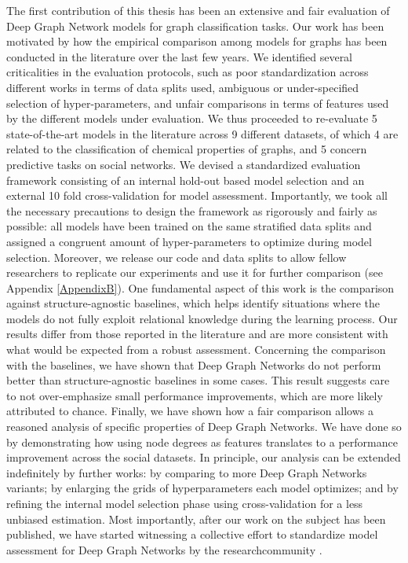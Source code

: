 The first contribution of this thesis has been an extensive and fair evaluation of Deep Graph Network models for graph classification tasks. Our work has been motivated by how the empirical comparison among models for graphs has been conducted in the literature over the last few years. We identified several criticalities in the evaluation protocols, such as poor standardization across different works in terms of data splits used, ambiguous or under-specified selection of hyper-parameters, and unfair comparisons in terms of features used by the different models under evaluation. We thus proceeded to re-evaluate 5 state-of-the-art models in the literature across 9 different datasets, of which 4 are related to the classification of chemical properties of graphs, and 5 concern predictive tasks on social networks. We devised a standardized evaluation framework consisting of an internal hold-out based model selection and an external 10 fold cross-validation for model assessment. Importantly, we took all the necessary precautions to design the framework as rigorously and fairly as possible: all models have been trained on the same stratified data splits and assigned a congruent amount of hyper-parameters to optimize during model selection. Moreover, we release our code and data splits to allow fellow researchers to replicate our experiments and use it for further comparison (see Appendix \ref{AppendixB}). One fundamental aspect of this work is the comparison against structure-agnostic baselines, which helps identify situations where the models do not fully exploit relational knowledge during the learning process. Our results differ from those reported in the literature and are more consistent with what would be expected from a robust assessment. Concerning the comparison with the baselines, we have shown that Deep Graph Networks do not perform better than structure-agnostic baselines in some cases. This result suggests care to not over-emphasize small performance improvements, which are more likely attributed to chance. Finally, we have shown how a fair comparison allows a reasoned analysis of specific properties of Deep Graph Networks. We have done so by demonstrating how using node degrees as features translates to a performance improvement across the social datasets. In principle, our analysis can be extended indefinitely by further works: by comparing to more Deep Graph Networks variants; by enlarging the grids of hyperparameters each model optimizes; and by refining the internal model selection phase using cross-validation for a less unbiased estimation. Most importantly, after our work on the subject has been published, we have started witnessing a collective effort to standardize model assessment for Deep Graph Networks by the researchcommunity \citep{hu2020ogb,morris2020tudatasets}.
\vspace{1em}

